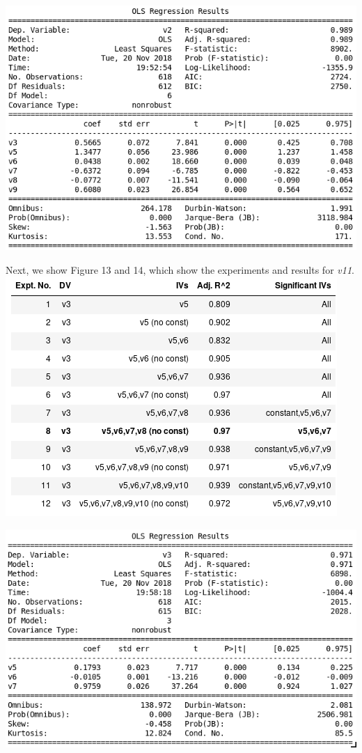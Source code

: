 \documentclass[12pt,a4paper]{article}
\begin{document}
\includegraphics[scale=0.5]{v2_sub_exp.png}
\begingroup
{}
\endgroup
\hfill\break

Next, we show Figure 13 and 14, which show the experiments and results for \textit{v11}.\\

\includegraphics[scale=0.5]{v3_sub_reg.png}
\begingroup
{}
\endgroup
\hfill\break

\includegraphics[scale=0.5]{v3_sub_exp.png}
\begingroup
{}
\endgroup
\hfill\break
\end{document}

